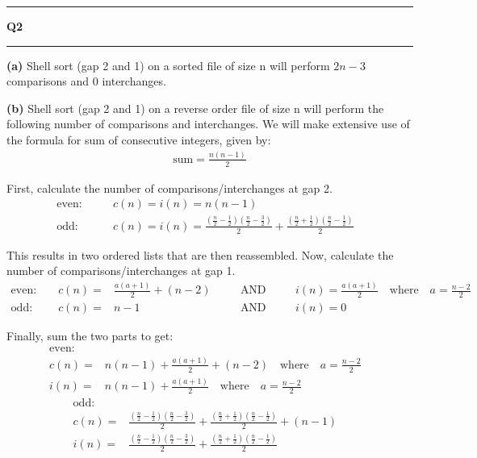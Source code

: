 \documentclass[11pt]{article}
\newcommand\question[2]{\vspace{.25in}\hrule\textbf{#1 #2}\vspace{.5em}\hrule\vspace{.10in}}
\renewcommand\part[1]{\vspace{.10in}\textbf{(#1)}}
\begin{document}
\question{Q2}{}
\part{a}  Shell sort (gap 2 and 1) on a sorted file of size n will perform $2n-3$ comparisons and 0 interchanges.

\part{b}  Shell sort (gap 2 and 1) on a reverse order file of size n will perform the following number of comparisons and interchanges. We will make extensive use of the formula for sum of consecutive integers, given by:
\begin{gather*}
	\text{sum} = \frac{n(n-1)}{2}
\end{gather*}

First, calculate the number of comparisons/interchanges at gap 2.
\begin{align*}
	\text{even: } && & c(n) = i(n) = n(n-1) & \\
	\text{odd: } && & c(n) = i(n) = \frac{(\frac{n}{2}-\frac{1}{2})(\frac{n}{2}-\frac{3}{2})}{2} + \frac{(\frac{n}{2}+\frac{1}{2})(\frac{n}{2}-\frac{1}{2})}{2} &
\end{align*}

This results in two ordered lists that are then reassembled. Now, calculate the number of comparisons/interchanges at gap 1.
\begin{align*}
	\text{even: } && c(n) = & \frac{a(a+1)}{2} + (n-2) \quad &&\text{AND}&& \quad i(n) = \frac{a(a+1)}{2} \quad \text{where} \quad a = \frac{n-2}{2} \\
	\text{odd: } && c(n) = & n-1 \quad &&\text{AND}&& \quad i(n) = 0
\end{align*}

Finally, sum the two parts to get:
\begin{align*}
	\text{even: } & \\ 
	c(n) = &  n(n-1) + \frac{a(a+1)}{2} + (n-2) \quad \text{where} \quad a = \frac{n-2}{2} &\\
	i(n) = &  n(n-1) + \frac{a(a+1)}{2} \quad \text{where} \quad a = \frac{n-2}{2} &
\end{align*}
\begin{align*}
	\text{odd: } & \\ 
	c(n) = & \frac{(\frac{n}{2}-\frac{1}{2})(\frac{n}{2}-\frac{3}{2})}{2} + \frac{(\frac{n}{2}+\frac{1}{2})(\frac{n}{2}-\frac{1}{2})}{2} + (n-1) &\\
	i(n) = &  \frac{(\frac{n}{2}-\frac{1}{2})(\frac{n}{2}-\frac{3}{2})}{2} + \frac{(\frac{n}{2}+\frac{1}{2})(\frac{n}{2}-\frac{1}{2})}{2} &
\end{align*}
\end{document}
